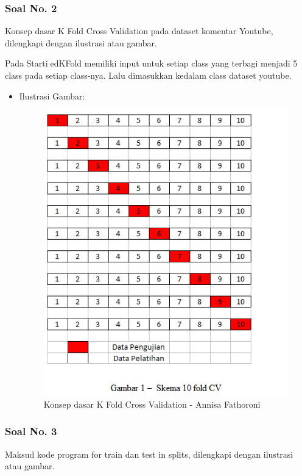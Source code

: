 \subsubsection{Soal No. 2}
Konsep dasar K Fold Cross Validation pada dataset komentar Youtube, dilengkapi dengan ilustrasi atau gambar.

Pada StartiedKFold memiliki input untuk setiap class yang terbagi menjadi 5 class pada setiap class-nya. Lalu dimasukkan kedalam class dataset youtube.

\begin{itemize}
\item Ilustrasi Gambar:

\begin{figure}[!hbtp]
\centering
\includegraphics[scale=0.5]{figures/Chapter 7/1164067/Teori/Chapter7AnnisaFathoroni2.png}
\caption{Konsep dasar K Fold Cross Validation - Annisa Fathoroni}
\label{Konsep dasar K Fold Cross Validation - Annisa Fathoroni}
\end{figure}

\end{itemize}

\subsubsection{Soal No. 3}
Maksud kode program for train dan test in splits, dilengkapi dengan ilustrasi atau gambar.

